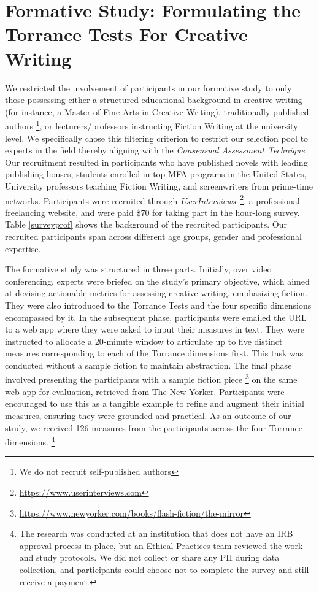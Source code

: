 \section{Formative Study: Formulating the Torrance Tests For Creative Writing} \label{sec:approach}
We restricted the involvement of participants in our formative study to only those possessing either a structured educational background in creative writing (for instance, a Master of Fine Arts in Creative Writing), traditionally published authors \footnote{We do not recruit self-published authors}, or lecturers/professors instructing Fiction Writing at the university level. We specifically chose this filtering criterion to restrict our selection pool to experts in the field thereby aligning with the \textit{Consensual Assessment Technique}. Our recruitment resulted in participants who have published novels with leading publishing houses, students enrolled in top MFA programs in the United States, University professors teaching Fiction Writing, and screenwriters from prime-time networks. Participants were recruited through \textit{UserInterviews}~\footnote{\url{https://www.userinterviews.com}}, a professional freelancing website, and were paid \$70 for taking part in the hour-long survey. Table \ref{surveyprof} shows the background of the recruited participants. Our recruited participants span across different age groups, gender and professional expertise.

The formative study was structured in three parts. Initially, over video conferencing, experts were briefed on the study's primary objective, which aimed at devising actionable metrics for assessing creative writing, emphasizing fiction. They were also introduced to the Torrance Tests and the four specific dimensions encompassed by it. In the subsequent phase, participants were emailed the URL to a web app where they were asked to input their measures in text. They were instructed to allocate a 20-minute window to articulate up to five distinct measures corresponding to each of the Torrance dimensions first. This task was conducted without a sample fiction to maintain abstraction. The final phase involved presenting the participants with a sample fiction piece \footnote{\url{https://www.newyorker.com/books/flash-fiction/the-mirror}} on the same web app for evaluation, retrieved from The New Yorker. Participants were encouraged to use this as a tangible example to refine and augment their initial measures, ensuring they were grounded and practical. As an outcome of our study, we received 126 measures from the participants across the four Torrance dimensions. \footnote{The research was conducted at an institution that does not have an IRB approval process in place, but an Ethical Practices team reviewed the work and study protocols. We did not collect or share any PII during data collection, and participants could choose not to complete the survey and still receive a payment.}

